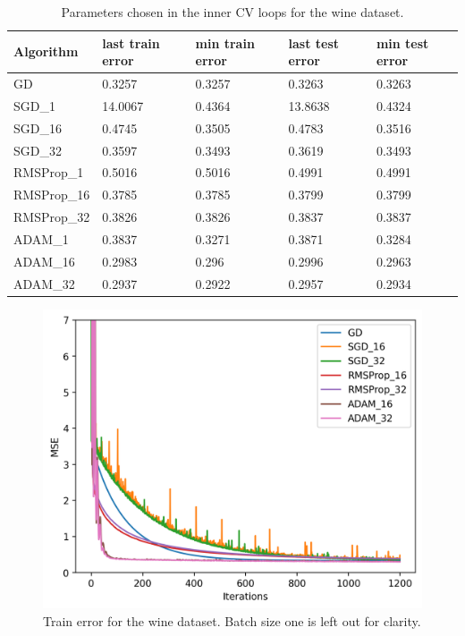 \documentclass[10pt,conference,compsocconf]{IEEEtran}
\begin{document}
\begin{table}[htbp]
	\centering
	\begin{tabular}[c]{lllll}
		\hline
		Algorithm&last train error& min train error& last test error& min test error\\
		\hline
		
		GD& 0.3257& 0.3257& 0.3263 &0.3263\\
		SGD\_1& 14.0067& 0.4364& 13.8638& 0.4324\\
		SGD\_16& 0.4745& 0.3505 &0.4783& 0.3516\\
		SGD\_32& 0.3597& 0.3493& 0.3619& 0.3493\\
		RMSProp\_1& 0.5016 &0.5016& 0.4991& 0.4991\\
		RMSProp\_16& 0.3785& 0.3785& 0.3799& 0.3799\\
		RMSProp\_32& 0.3826& 0.3826& 0.3837& 0.3837\\
		ADAM\_1& 0.3837& 0.3271& 0.3871& 0.3284\\
		ADAM\_16& 0.2983& 0.296& 0.2996& 0.2963\\
		ADAM\_32 &0.2937& 0.2922& 0.2957& 0.2934\\
		\hline
	\end{tabular}
	\caption{Parameters chosen in the inner CV loops for the wine dataset.}
	\label{tab:wine_mses}
\end{table}
\begin{figure}[htbp]
	\centering
	\includegraphics[width=\columnwidth]{pictures/wine_train_16_32}
	\caption{Train error for the wine dataset. Batch size one is left out for clarity.}
	\vspace{-3mm}
	\label{fig:wine_train_16_32}
\end{figure}
\end{document}

